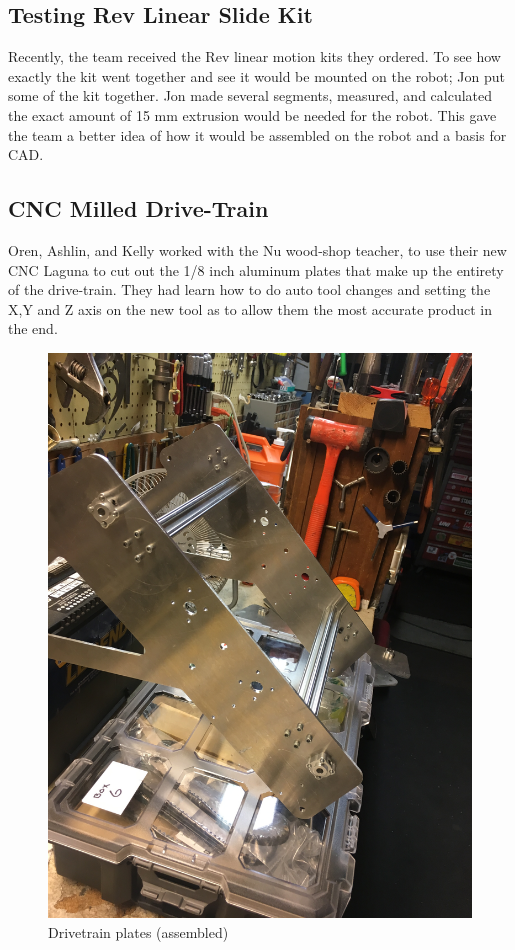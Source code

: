 \documentclass{article}
\begin{document}
\subsection{Testing Rev Linear Slide Kit}
Recently, the team received the Rev linear motion kits they ordered. To see how exactly the kit went together and see it would be mounted on the robot; Jon put some of the kit together. Jon made several segments, measured, and calculated the exact amount of 15 mm extrusion would be needed for the robot. This gave the team a better idea of how it would be assembled on the robot and a basis for CAD.

\subsection{CNC Milled Drive-Train }
Oren, Ashlin, and Kelly worked with the Nu wood-shop teacher, to use their new CNC Laguna to cut out the 1/8 inch aluminum plates that make up the entirety of the drive-train. They had learn how to do auto tool changes and setting the X,Y and Z axis on the new tool as to allow them the most accurate product in the end.

\begin{figure}
    \centering
    \includegraphics[width=.6 \textwidth]{07_10-15/images/drivetrain.JPG}
    \caption{Drivetrain plates (assembled)}
    \label{fig:plates}
\end{figure}
\end{document}
